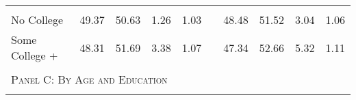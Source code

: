 \begin{table}[htpb!]
\begin{center}
{\begin{tabular}{lccccp{6mm}cccc}
\begin{footnotesize}\end{footnotesize}& 
\begin{footnotesize}\end{footnotesize}& 
\begin{footnotesize}\end{footnotesize}& 
\begin{footnotesize}\end{footnotesize}& 
\begin{footnotesize}\end{footnotesize}& 
\begin{footnotesize}\end{footnotesize}& 
\begin{footnotesize}\end{footnotesize}& 
\begin{footnotesize}\end{footnotesize}\\ 
No College&49.37&50.63&1.26&1.03
&&48.48&51.52&3.04&1.06
\\ 
Some College +&48.31&51.69&3.38&1.07
&&47.34&52.66&5.32&1.11
\\ 
 &&&&&&&&& \\\multicolumn{10}{l}{\textsc{Panel C: By Age and Education}}\\
\begin{footnotesize}\end{footnotesize}& 
\begin{footnotesize}\end{footnotesize}& 
\begin{footnotesize}\end{footnotesize}& 
\begin{footnotesize}\end{footnotesize}& 
\begin{footnotesize}\end{footnotesize}& 
\begin{footnotesize}\end{footnotesize}& 
\begin{footnotesize}\end{footnotesize}& 
\begin{footnotesize}\end{footnotesize}& 
\begin{footnotesize}\end{footnotesize}& 
\begin{footnotesize}\end{footnotesize}\\ 

\end{tabular}}
\end{center}
\end{table}
